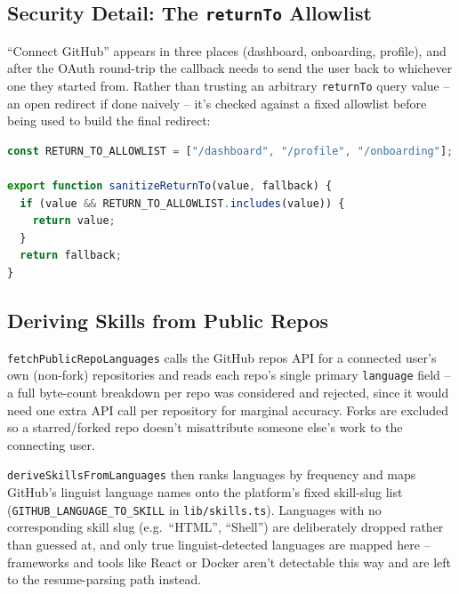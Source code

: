 \documentclass[11pt,a4paper]{article}
\begin{document}
\subsection{Security Detail: The \texttt{returnTo} Allowlist}
``Connect GitHub'' appears in three places (dashboard, onboarding,
profile), and after the OAuth round-trip the callback needs to
send the user back to whichever one they started from. Rather than
trusting an arbitrary \texttt{returnTo} query value -- an open
redirect if done naively -- it's checked against a fixed allowlist
before being used to build the final redirect:
\begin{lstlisting}[language=JavaScript]
const RETURN_TO_ALLOWLIST = ["/dashboard", "/profile", "/onboarding"];

export function sanitizeReturnTo(value, fallback) {
  if (value && RETURN_TO_ALLOWLIST.includes(value)) {
    return value;
  }
  return fallback;
}
\end{lstlisting}

\subsection{Deriving Skills from Public Repos}
\texttt{fetchPublicRepoLanguages} calls the GitHub repos API for a
connected user's own (non-fork) repositories and reads each repo's
single primary \texttt{language} field -- a full byte-count
breakdown per repo was considered and rejected, since it would
need one extra API call per repository for marginal accuracy.
Forks are excluded so a starred/forked repo doesn't misattribute
someone else's work to the connecting user.

\texttt{deriveSkillsFromLanguages} then ranks languages by
frequency and maps GitHub's linguist language names onto the
platform's fixed skill-slug list
(\texttt{GITHUB\_LANGUAGE\_TO\_SKILL} in \texttt{lib/skills.ts}).
Languages with no corresponding skill slug (e.g.\ ``HTML'',
``Shell'') are deliberately dropped rather than guessed at, and
only true linguist-detected languages are mapped here --
frameworks and tools like React or Docker aren't detectable this
way and are left to the resume-parsing path instead.
\end{document}
